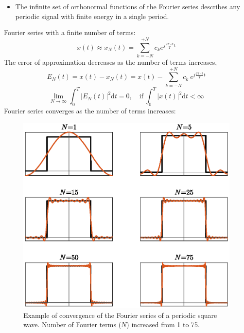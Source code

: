 \begin{itemize}
    \item The infinite set of orthonormal functions of the Fourier series describes any periodic signal with finite energy in a single period.
\end{itemize}

\begin{tcolorbox}[breakable]
Fourier series with a finite number of terms:
\[
    x(t) \approx x_{N}(t) = \sum_{k=-N}^{+N} c_{k} e^{j\frac{2\pi\cdot k}{T}t}
\]
The error of approximation decreases as the number of terms increases,
\[
    E_{N}(t) = x(t)-x_{N}(t) = x(t)- \sum_{k=-N}^{+N} c_{k} \ e^{j\frac{2\pi\cdot k}{T}t}
\]
\[
    \lim_{N \to \infty} \int_{0}^{T} \lvert E_{N}(t) \rvert^{2} \mathrm{d}t = 0, \quad \text{if} \ \int_{0}^{T} \lvert x(t) \rvert^{2} \mathrm{d}t < \infty
\] 
Fourier series converges as the number of terms increases:
\begin{figure}[H]
    \centering
    \includegraphics[width = \textwidth]{images/fSeries_terms.eps}
    \caption{Example of convergence of the Fourier series of a periodic square wave. Number of Fourier terms ($N$) increased from 1 to 75.} 
\end{figure}
\end{tcolorbox}
